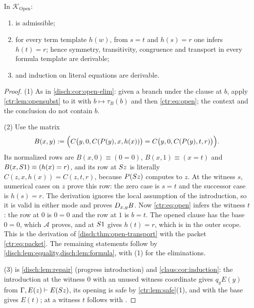 \begin{lemma}\label{ctr:lem:openrules}
In $\mathcal K_{\mathrm{Open}}$:
\begin{enumerate}
\item {} is admissible;
\item for every term template $h(w)$, from $s=t$ and $h(s)=r$ one infers $h(t)=r$; hence
symmetry, transitivity, congruence and transport in every formula template are derivable;
\item {} and induction on literal equations are derivable.
\end{enumerate}
\end{lemma}
\begin{proof}
(1) As in \cref{disch:cor:open-elim}: given a branch under the clause at $b$, apply
\cref{ctr:lem:opensubst} to it with $b\mapsto\tau_B(b)$ and then \eqref{ctr:eq:open}; the
context and the conclusion do not contain $b$.

(2) Use the matrix
\begin{equation}\label{ctr:eq:packet}
 B(x,y)\mathrel{:=}\Bigl(C\bigl(y,0,C(P(y),x,h(x))\bigr)=C\bigl(y,0,C(P(y),t,r)\bigr)\Bigr).
\end{equation}
Its normalized rows are $B(x,0)\equiv(0=0)$, $B(x,1)\equiv(x=t)$ and
$B(x,S 1)\equiv(h(x)=r)$, and its row at $S z$ is literally
$C(z,x,h(x))=C(z,t,r)$, because $P(S z)$ computes to $z$. At the witness $s$, numerical
cases on $z$ prove this row: the zero case is $s=t$ and the successor case is $h(s)=r$. The
derivation ignores the local assumption of the introduction, so it is valid in either mode
and proves $D_{x,y}B$. Now \eqref{ctr:eq:open} infers the witness $t$: the row at $0$ is
$0=0$ and the row at $1$ is $b=t$. The opened clause has the base $0=0$, which
$\mathcal A$ proves, and  at $S 1$ gives $h(t)=r$, which is in the outer
scope. This is the derivation of \cref{disch:thm:open-transport} with the packet
\eqref{ctr:eq:packet}. The remaining statements follow by
\cref{disch:lem:equality,disch:lem:formula}, with (1) for the eliminations.

(3) is \cref{disch:lem:repair} (progress introduction) and \cref{claus:cor:induction}:
the introduction at the witness $0$ with an unused witness coordinate gives $q_yE(y)$ from
$\Gamma,E(z)\vdash E(S z)$, its opening is safe by \cref{ctr:lem:safe}(1), and
 with the base gives $E(t)$;  at a witness $t$ follows with
.
\end{proof}

